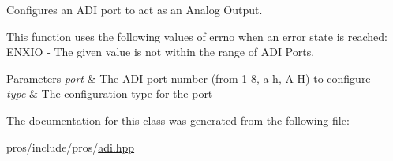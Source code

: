 Configures an A\+DI port to act as an Analog Output. 

This function uses the following values of errno when an error state is reached\+: E\+N\+X\+IO -\/ The given value is not within the range of A\+DI Ports.


\begin{DoxyParams}{Parameters}
{\em port} & The A\+DI port number (from 1-\/8, \textquotesingle{}a\textquotesingle{}-\/\textquotesingle{}h\textquotesingle{}, \textquotesingle{}A\textquotesingle{}-\/\textquotesingle{}H\textquotesingle{}) to configure \\
\hline
{\em type} & The configuration type for the port \\
\hline
\end{DoxyParams}


The documentation for this class was generated from the following file\+:\begin{DoxyCompactItemize}
\item 
pros/include/pros/\hyperlink{adi_8hpp}{adi.\+hpp}\end{DoxyCompactItemize}
